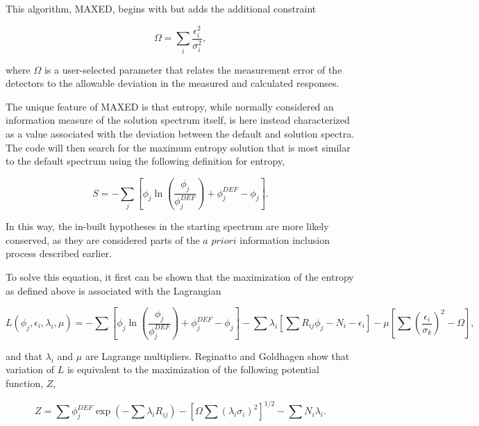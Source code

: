 This algorithm, MAXED, begins with  but adds the additional constraint

\begin{equation}
\label{eqn:maxed-omega}
\Omega = \sum_i \frac{\epsilon_i^2}{\sigma_i^2} ,
\end{equation}

\noindent
where $\Omega$ is a user-selected parameter that relates the measurement error of the detectors to the allowable deviation in the measured and calculated responses.

The unique feature of MAXED is that entropy, while normally considered an information measure of the solution spectrum itself, is here instead characterized as a value associated with the deviation between the default and solution spectra.
The code will then search for the maximum entropy solution that is most similar to the default spectrum using the following definition for entropy,

\begin{equation}
\label{eqn:maxed-skilling}
S = - \sum_j [\phi_j \ln (\frac{\phi_j}{\phi_j^{DEF}}) + \phi_j^{DEF} - \phi_j] .
\end{equation}

\noindent
In this way, the in-built hypotheses in the starting spectrum are more likely conserved, as they are considered parts of the $a$ \hspace{0.002\textwidth} $priori$ information inclusion process described earlier.

To solve this equation, it first can be shown that the maximization of the entropy as defined above is associated with the Lagrangian

\begin{equation}
\label{eqn:maxed-lagrangian}
L(\phi_j, \epsilon_i, \lambda_i, \mu) = -\sum [\phi_j \ln (\frac{\phi_j}{\phi_j^{DEF}}) + \phi_j^{DEF} - \phi_j] - \sum \lambda_i [\sum R_{ij} \phi_j - N_i - \epsilon_i] - \mu [\sum (\frac{\epsilon_i}{\sigma_k})^2 - \Omega] ,
\end{equation}

\noindent
and that $\lambda_i$ and $\mu$ are Lagrange multipliers.
Reginatto and Goldhagen show that variation of $L$ is equivalent to the maximization of the following potential function, $Z$,

\begin{equation}
\label{eqn:maxed-potential}
Z = \sum \phi_j^{DEF} \exp(-\sum \lambda_i R_{ij}) - [\Omega \sum (\lambda_i \sigma_i)^2]^{1/2} - \sum N_i \lambda_i .
\end{equation}

